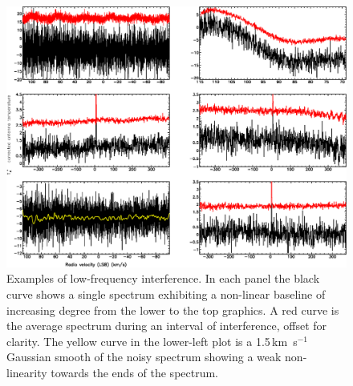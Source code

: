 \documentclass[final,authoryear,5p,times,twocolumn]{elsarticle}
\begin{document}
\begin{figure}[t]
\includegraphics[width=\columnwidth]{examples_non-linear_baselines.pdf}
\caption{Examples of low-frequency interference.  In each panel the
  black curve shows a single spectrum exhibiting a non-linear baseline
  of increasing degree from the lower to the top graphics.  A red curve
  is the average spectrum during an interval of interference, offset
  for clarity.  The yellow curve in the lower-left plot is a
  1.5\,km~s$^{-1}$ Gaussian smooth of the noisy spectrum showing a
  weak non-linearity towards the ends of the spectrum.}
\label{fig:badbase:interference}
\end{figure}
\end{document}
